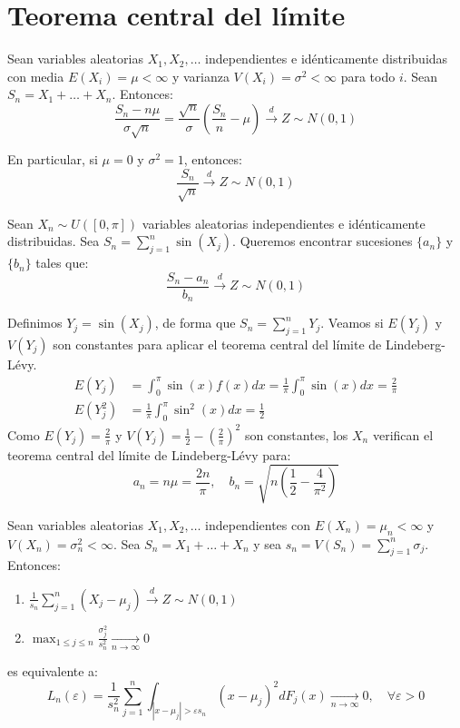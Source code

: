 \section{Teorema central del límite}
\begin{theorem}
    Sean variables aleatorias $X_1, X_2, \dots$ independientes e idénticamente distribuidas con media $E(X_i) = \mu < \infty$ y varianza $V(X_i) = \sigma^2 < \infty$ para todo $i$.
    Sean $S_n = X_1 + \dots + X_n$.
    Entonces:
    $$\frac{S_n-n\mu}{\sigma\sqrt{n}} = \frac{\sqrt{n}}{\sigma}\left(\frac{S_n}{n}-\mu\right) \xrightarrow{d} Z \sim N(0, 1)$$
\end{theorem}

\begin{remark}
    En particular, si $\mu = 0$ y $\sigma^2 = 1$, entonces:
    $$\frac{S_n}{\sqrt{n}} \xrightarrow{d} Z \sim N(0, 1)$$
\end{remark}

\begin{exercise}
    Sean $X_n \sim U([0, \pi])$ variables aleatorias independientes e idénticamente distribuidas.
    Sea $S_n = \sum_{j=1}^n \sin(X_j)$.
    Queremos encontrar sucesiones $\{a_n\}$ y $\{b_n\}$ tales que:
    $$\frac{S_n-a_n}{b_n} \xrightarrow{d} Z \sim N(0, 1)$$

    Definimos $Y_j = \sin(X_j)$, de forma que $S_n = \sum_{j=1}^n Y_j$.
    Veamos si $E(Y_j)$ y $V(Y_j)$ son constantes para aplicar el teorema central del límite de Lindeberg-Lévy.
    \begin{align*}
        E(Y_j)   & = \int_0^\pi \sin(x)f(x)dx = \frac{1}{\pi} \int_0^\pi \sin(x)dx = \frac{2}{\pi} \\
        E(Y_j^2) & = \frac{1}{\pi} \int_0^\pi \sin^2(x)dx = \frac{1}{2}
    \end{align*}
    Como $E(Y_j) = \frac{2}{\pi}$ y $V(Y_j) = \frac{1}{2} - \left(\frac{2}{\pi}\right)^2$ son constantes, los $X_n$ verifican el teorema central del límite de Lindeberg-Lévy para:
    $$a_n = n\mu = \frac{2n}{\pi}, \quad b_n = \sqrt{n\left(\frac{1}{2}-\frac{4}{\pi^2}\right)}$$
\end{exercise}

\begin{theorem}
    Sean variables aleatorias $X_1, X_2, \dots$ independientes con $E(X_n) = \mu_n < \infty$ y $V(X_n) = \sigma^2_n < \infty$.
    Sea $S_n = X_1 + \dots + X_n$ y sea $s_n = V(S_n) = \sum_{j=1}^n \sigma_j$.
    Entonces:
    \begin{enumerate}
        \item $\frac{1}{s_n} \sum_{j=1}^n (X_j-\mu_j) \xrightarrow{d} Z \sim N(0, 1)$
        \item $\max_{1 \leq j \leq n} \frac{\sigma^2_j}{s_n^2} \xrightarrow[n \to \infty]{} 0$
    \end{enumerate}
    es equivalente a:
    $$L_n(\varepsilon) = \frac{1}{s_n^2} \sum_{j=1}^n \int_{|x-\mu_j| > \varepsilon s_n} (x-\mu_j)^2dF_j(x) \xrightarrow[n \to \infty]{} 0, \quad \forall \varepsilon > 0$$
\end{theorem}